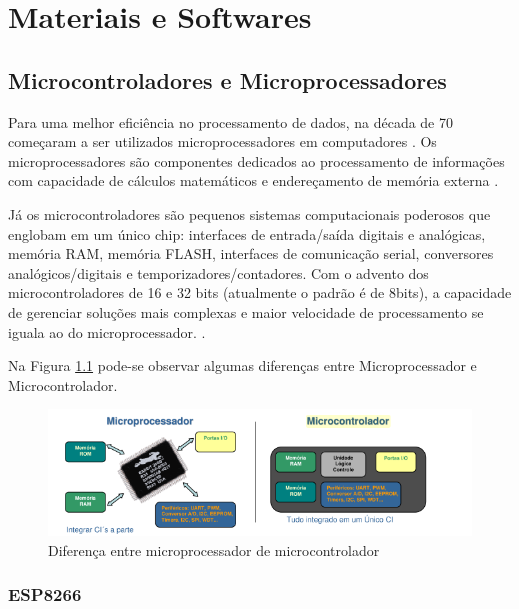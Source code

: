 \chapter{Materiais e Softwares}

\section{Microcontroladores e Microprocessadores}

Para uma melhor eficiência no processamento de dados, na década de 70
começaram a ser utilizados microprocessadores em computadores \cite{martins2005sistemas}. Os microprocessadores são componentes dedicados ao processamento de informações com
capacidade de cálculos matemáticos e endereçamento de memória externa \cite{chase2007sistemas}.

Já os microcontroladores são pequenos sistemas computacionais poderosos que englobam em um único chip: interfaces de entrada/saída digitais e analógicas, memória RAM, memória FLASH, interfaces de comunicação serial, conversores analógicos/digitais e temporizadores/contadores. Com o advento dos microcontroladores de 16 e 32 bits (atualmente o padrão é de 8bits), a capacidade de gerenciar soluções mais complexas e maior velocidade de processamento se iguala ao do microprocessador. \cite{chase2007sistemas}.

Na Figura \ref{fig:microprocessador-microcontrolador} pode-se observar algumas diferenças entre Microprocessador e Microcontrolador.

\begin{figure}[htbp]
	\centering
	\includegraphics[scale=0.7]{figuras/processa-controla.png}
	\caption{Diferença entre microprocessador de microcontrolador}
	\label{fig:microprocessador-microcontrolador}
\end{figure}

\subsection{ESP8266}

